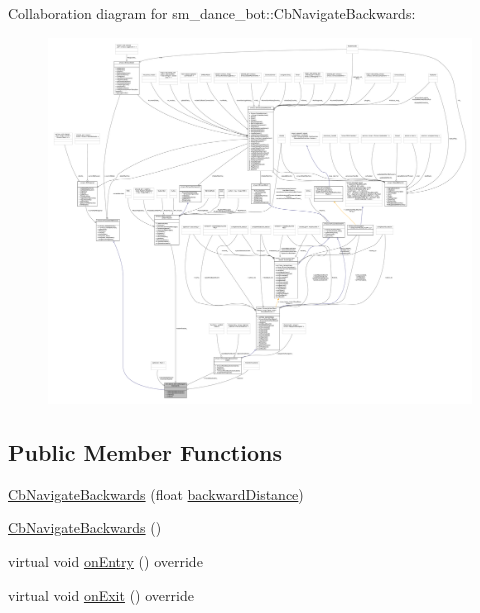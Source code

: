 Collaboration diagram for sm\+\_\+dance\+\_\+bot\+:\+:Cb\+Navigate\+Backwards\+:
\nopagebreak
\begin{figure}[H]
\begin{center}
\leavevmode
\includegraphics[width=350pt]{classsm__dance__bot_1_1CbNavigateBackwards__coll__graph}
\end{center}
\end{figure}
\subsection*{Public Member Functions}
\begin{DoxyCompactItemize}
\item 
\hyperlink{classsm__dance__bot_1_1CbNavigateBackwards_aa5bcc8ba901c4464370399158d5818b6}{Cb\+Navigate\+Backwards} (float \hyperlink{classsm__dance__bot_1_1CbNavigateBackwards_ad5b1a7d85676aefa31f966baf61b6378}{backward\+Distance})
\item 
\hyperlink{classsm__dance__bot_1_1CbNavigateBackwards_ac2a9b5ab4d13f2af824511c9385c2d6d}{Cb\+Navigate\+Backwards} ()
\item 
virtual void \hyperlink{classsm__dance__bot_1_1CbNavigateBackwards_a5d7816a541c5f7121c9909d5b43a81c8}{on\+Entry} () override
\item 
virtual void \hyperlink{classsm__dance__bot_1_1CbNavigateBackwards_ac85cc397d597120fc8906b98d4241fe8}{on\+Exit} () override
\end{DoxyCompactItemize}
